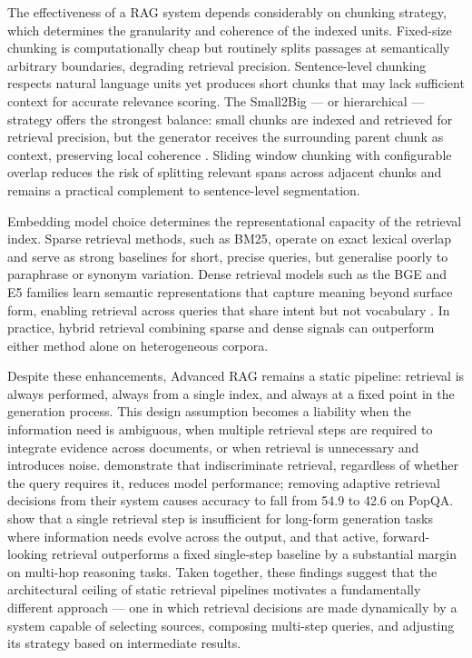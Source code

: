The effectiveness of a RAG system depends considerably on chunking strategy, which determines the granularity and coherence of the indexed units. Fixed-size chunking is computationally cheap but routinely splits passages at semantically arbitrary boundaries, degrading retrieval precision. Sentence-level chunking respects natural language units yet produces short chunks that may lack sufficient context for accurate relevance scoring. The Small2Big — or hierarchical — strategy offers the strongest balance: small chunks are indexed and retrieved for retrieval precision, but the generator receives the surrounding parent chunk as context, preserving local coherence \cite{gao2023ragsurvey}. Sliding window chunking with configurable overlap reduces the risk of splitting relevant spans across adjacent chunks and remains a practical complement to sentence-level segmentation.

Embedding model choice determines the representational capacity of the retrieval index. Sparse retrieval methods, such as BM25, operate on exact lexical overlap and serve as strong baselines for short, precise queries, but generalise poorly to paraphrase or synonym variation. Dense retrieval models such as the BGE and E5 families learn semantic representations that capture meaning beyond surface form, enabling retrieval across queries that share intent but not vocabulary \cite{lewis2020rag}. In practice, hybrid retrieval combining sparse and dense signals can outperform either method alone on heterogeneous corpora.

Despite these enhancements, Advanced RAG remains a static pipeline: retrieval is always performed, always from a single index, and always at a fixed point in the generation process. This design assumption becomes a liability when the information need is ambiguous, when multiple retrieval steps are required to integrate evidence across documents, or when retrieval is unnecessary and introduces noise.  demonstrate that indiscriminate retrieval, regardless of whether the query requires it, reduces model performance; removing adaptive retrieval decisions from their system causes accuracy to fall from 54.9 to 42.6 on PopQA.  show that a single retrieval step is insufficient for long-form generation tasks where information needs evolve across the output, and that active, forward-looking retrieval outperforms a fixed single-step baseline by a substantial margin on multi-hop reasoning tasks. Taken together, these findings suggest that the architectural ceiling of static retrieval pipelines motivates a fundamentally different approach — one in which retrieval decisions are made dynamically by a system capable of selecting sources, composing multi-step queries, and adjusting its strategy based on intermediate results.


